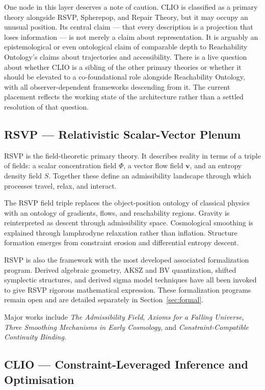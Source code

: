 \documentclass[12pt, twoside]{article}
\begin{document}
One node in this layer deserves a note of caution. CLIO is classified as a
primary theory alongside RSVP, Spherepop, and Repair Theory, but it may
occupy an unusual position. Its central claim — that every description is a
projection that loses information — is not merely a claim about representation.
It is arguably an epistemological or even ontological claim of comparable
depth to Reachability Ontology's claims about trajectories and accessibility.
There is a live question about whether CLIO is a sibling of the other primary
theories or whether it should be elevated to a co-foundational role alongside
Reachability Ontology, with all observer-dependent frameworks descending from
it. The current placement reflects the working state of the architecture
rather than a settled resolution of that question.

\subsection{RSVP — Relativistic Scalar-Vector Plenum}

RSVP is the field-theoretic primary theory. It describes reality in terms of
a triple of fields: a scalar concentration field $\Phi$, a vector flow field
$\mathbf{v}$, and an entropy density field $S$. Together these define an
admissibility landscape through which processes travel, relax, and interact.

The RSVP field triple replaces the object-position ontology of classical
physics with an ontology of gradients, flows, and reachability regions.
Gravity is reinterpreted as descent through admissibility space. Cosmological
smoothing is explained through lamphrodyne relaxation rather than inflation.
Structure formation emerges from constraint erosion and differential entropy
descent.

RSVP is also the framework with the most developed associated formalization
program. Derived algebraic geometry, AKSZ and BV quantization, shifted
symplectic structures, and derived sigma model techniques have all been
invoked to give RSVP rigorous mathematical expression. These formalization
programs remain open and are detailed separately in Section~\ref{sec:formal}.

Major works include \emph{The Admissibility Field}, \emph{Axioms for a
Falling Universe}, \emph{Three Smoothing Mechanisms in Early Cosmology}, and
\emph{Constraint-Compatible Continuity Binding}.

\subsection{CLIO — Constraint-Leveraged Inference and Optimisation}
\end{document}
